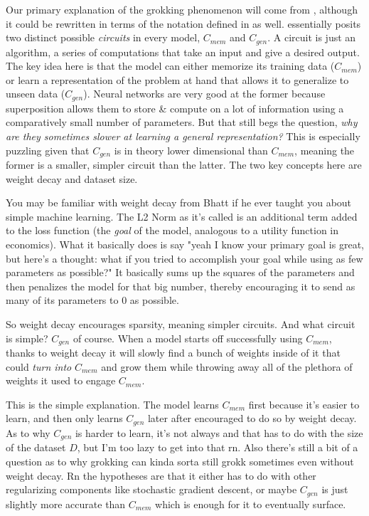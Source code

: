\documentclass{article}
\begin{document}
Our primary explanation of the grokking phenomenon will come from \cite{varma2023explaining}, although it could be rewritten in terms of the notation defined in \cite{} as well. \cite{varma2023explaining} essentially posits two distinct possible \textit{circuits} in every model, $C_{mem}$ and $C_{gen}$.
A circuit is just an algorithm, a series of computations that take an input and give a desired output\cite{olah2020zoom}.
The key idea here is that the model can either memorize its training data ($C_{mem}$) or learn a representation of the problem at hand that allows it to generalize to unseen data ($C_{gen}$). 
Neural networks are very good at the former because superposition\cite{elhage2022toy} allows them to store \& compute on a lot of information using a comparatively small number of parameters.
But that still begs the question, \textit{why are they sometimes slower at learning a general representation?}
This is especially puzzling given that $C_{gen}$ is in theory lower dimensional than $C_{mem}$, meaning the former is a smaller, simpler circuit than the latter. 
The two key concepts here are weight decay and dataset size.\par

You may be familiar with weight decay from Bhatt if he ever taught you about simple machine learning.
The L2 Norm as it's called is an additional term added to the loss function (the \textit{goal} of the model, analogous to a utility function in economics).
What it basically does is say "yeah I know your primary goal is great, but here's a thought: what if you tried to accomplish your goal while using as few parameters as possible?"
It basically sums up the squares of the parameters and then penalizes the model for that big number, thereby encouraging it to send as many of its parameters to 0 as possible.\par

So weight decay encourages sparsity, meaning simpler circuits.
And what circuit is simple?
$C_{gen}$ of course.
When a model starts off successfully using $C_{mem}$, thanks to weight decay it will slowly find a bunch of weights inside of it that could \textit{turn into} $C_{mem}$ and grow them while throwing away all of the plethora of weights it used to engage $C_{mem}$.\par

This is the simple explanation. 
The model learns $C_{mem}$ first because it's easier to learn, and then only learns $C_{gen}$ later after encouraged to do so by weight decay.
As to why $C_{gen}$ is harder to learn, it's not always and that has to do with the size of the dataset $D$, but I'm too lazy to get into that rn.
Also there's still a bit of a question as to why grokking can kinda sorta still grokk sometimes even without weight decay.
Rn the hypotheses are that it either has to do with other regularizing components like stochastic gradient descent, or maybe $C_{gen}$ is just slightly more accurate than $C_{mem}$ which is enough for it to eventually surface. \par
\end{document}
